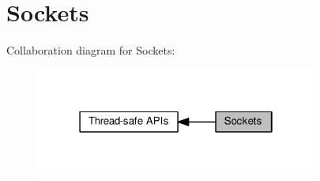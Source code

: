 \hypertarget{group__lwip__opts__socket}{}\section{Sockets}
\label{group__lwip__opts__socket}
Collaboration diagram for Sockets\+:
\nopagebreak
\begin{figure}[H]
\begin{center}
\leavevmode
\includegraphics[width=262pt]{group__lwip__opts__socket}
\end{center}
\end{figure}
